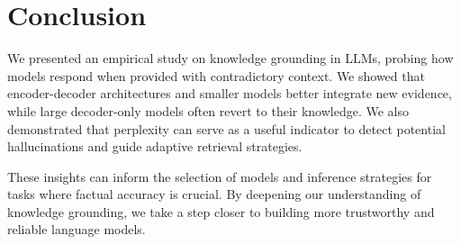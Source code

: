\section{Conclusion}

We presented an empirical study on knowledge grounding in LLMs, probing how models respond when provided with contradictory context.
We showed that encoder-decoder architectures and smaller models better integrate new evidence, while large decoder-only models often revert to their \Parametric{} knowledge.
We also demonstrated that perplexity can serve as a useful indicator to detect potential hallucinations and guide adaptive retrieval strategies.

These insights can inform the selection of models and inference strategies for tasks where factual accuracy is crucial.
By deepening our understanding of knowledge grounding, we take a step closer to building more trustworthy and reliable language models.
